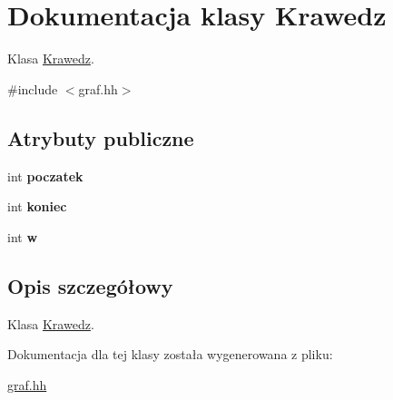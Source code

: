 \hypertarget{class_krawedz}{\section{\-Dokumentacja klasy \-Krawedz}
\label{class_krawedz}
}


\-Klasa \hyperlink{class_krawedz}{\-Krawedz}.  




{\ttfamily \#include $<$graf.\-hh$>$}

\subsection*{\-Atrybuty publiczne}
\begin{DoxyCompactItemize}
\item 
\hypertarget{class_krawedz_a422f4102c33b082b0595dee03193e51c}{int {\bfseries poczatek}}\label{class_krawedz_a422f4102c33b082b0595dee03193e51c}

\item 
\hypertarget{class_krawedz_a42091dbc3101653ec61137823d0a8799}{int {\bfseries koniec}}\label{class_krawedz_a42091dbc3101653ec61137823d0a8799}

\item 
\hypertarget{class_krawedz_af77ca105953ed20c818b5c294eedbaa4}{int {\bfseries w}}\label{class_krawedz_af77ca105953ed20c818b5c294eedbaa4}

\end{DoxyCompactItemize}


\subsection{\-Opis szczegółowy}
\-Klasa \hyperlink{class_krawedz}{\-Krawedz}. 



\-Dokumentacja dla tej klasy została wygenerowana z pliku\-:\begin{DoxyCompactItemize}
\item 
\hyperlink{graf_8hh}{graf.\-hh}\end{DoxyCompactItemize}
